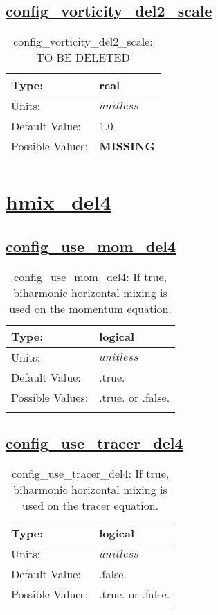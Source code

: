 \subsection[config\_vorticity\_del2\_scale]{\hyperref[sec:nm_tab_hmix_del2]{config\_vorticity\_del2\_scale}}
\label{subsec:nm_sec_config_vorticity_del2_scale}
\begin{center}
\begin{longtable}{| p{2.0in} | p{4.0in} |}
    \hline
    Type: & real \\
    \hline
    Units: & $unitless$ \\
    \hline
    Default Value: & 1.0 \\
    \hline
    Possible Values: & {\bf \color{red} MISSING} \\
    \hline
    \caption{config\_vorticity\_del2\_scale: {\color{red} TO BE DELETED}}
\end{longtable}
\end{center}
\section[hmix\_del4]{\hyperref[sec:nm_tab_hmix_del4]{hmix\_del4}}
\label{sec:nm_sec_hmix_del4}
\subsection[config\_use\_mom\_del4]{\hyperref[sec:nm_tab_hmix_del4]{config\_use\_mom\_del4}}
\label{subsec:nm_sec_config_use_mom_del4}
\begin{center}
\begin{longtable}{| p{2.0in} | p{4.0in} |}
    \hline
    Type: & logical \\
    \hline
    Units: & $unitless$ \\
    \hline
    Default Value: & .true. \\
    \hline
    Possible Values: & .true. or .false. \\
    \hline
    \caption{config\_use\_mom\_del4: If true, biharmonic horizontal mixing is used on the momentum equation.}
\end{longtable}
\end{center}
\subsection[config\_use\_tracer\_del4]{\hyperref[sec:nm_tab_hmix_del4]{config\_use\_tracer\_del4}}
\label{subsec:nm_sec_config_use_tracer_del4}
\begin{center}
\begin{longtable}{| p{2.0in} | p{4.0in} |}
    \hline
    Type: & logical \\
    \hline
    Units: & $unitless$ \\
    \hline
    Default Value: & .false. \\
    \hline
    Possible Values: & .true. or .false. \\
    \hline
    \caption{config\_use\_tracer\_del4: If true, biharmonic horizontal mixing is used on the tracer equation.}
\end{longtable}
\end{center}
